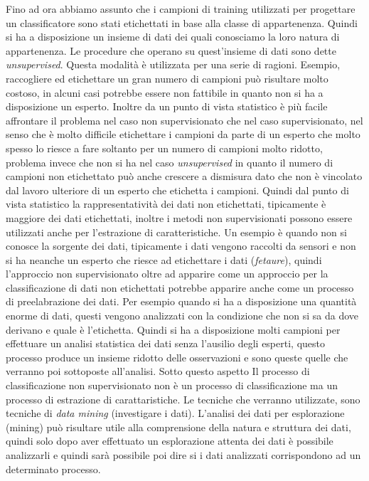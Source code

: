 
Fino ad ora abbiamo assunto che i campioni di training utilizzati per progettare un classificatore sono stati etichettati in base alla classe di appartenenza. Quindi si ha a disposizione un insieme di dati dei quali conosciamo la loro natura di appartenenza. Le procedure che operano su quest'insieme di dati sono dette \emph{unsupervised}. Questa modalità è utilizzata per una serie di ragioni. Esempio, raccogliere ed etichettare un gran numero di campioni può risultare molto costoso, in alcuni casi potrebbe essere non fattibile in quanto non si ha a disposizione un esperto. Inoltre da un punto di vista statistico è più facile affrontare il problema nel caso non supervisionato che nel caso supervisionato, nel senso che è molto difficile etichettare i campioni da parte di un esperto che molto spesso lo riesce a fare soltanto per un numero di campioni molto ridotto, problema invece che non si ha nel caso \emph{unsupervised} in quanto il numero di campioni non etichettato può anche crescere a dismisura dato che non è vincolato dal lavoro ulteriore di un esperto che etichetta i campioni. Quindi dal punto di vista statistico la rappresentatività dei dati non etichettati, tipicamente è maggiore dei dati etichettati, inoltre i metodi non supervisionati possono essere utilizzati anche per l'estrazione di caratteristiche. 
Un esempio è quando non si conosce la sorgente dei dati, tipicamente i dati vengono raccolti da sensori e non si ha neanche un esperto che riesce ad etichettare i dati (\emph{fetaure}), quindi l'approccio non supervisionato oltre ad apparire come un approccio per la classificazione di dati non etichettati  potrebbe apparire anche come un processo di preelabrazione dei dati. Per esempio quando si ha a disposizione una quantità enorme di dati, questi vengono analizzati con la condizione che non si sa da dove derivano e quale è l'etichetta. Quindi si ha a disposizione  molti campioni per effettuare un analisi statistica dei dati senza l'ausilio degli esperti, questo processo produce un insieme ridotto delle osservazioni e sono queste quelle che verranno poi sottoposte all'analisi. Sotto questo aspetto Il processo di classificazione non supervisionato non è un processo di classificazione ma un processo di estrazione di carattaristiche. Le tecniche che verranno utilizzate, sono tecniche di \emph{data mining} (investigare i dati). L'analisi dei dati per esplorazione (mining) può risultare utile alla comprensione della natura e struttura dei dati, quindi solo dopo aver effettuato un esplorazione attenta dei dati è possibile analizzarli e quindi sarà possibile poi dire si i dati analizzati corrispondono ad un determinato processo.\\

